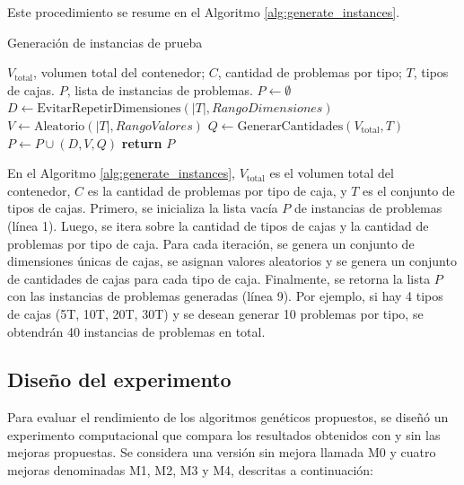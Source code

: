 \documentclass[openany]{article}
\begin{document}
Este procedimiento se resume en el Algoritmo \ref{alg:generate_instances}.

\begin{algorithm}[H]
    \caption{Generación de instancias de prueba}
    \label{alg:generate_instances}
    \begin{algorithmic}[1]
        \Require $V_{\text{total}}$, volumen total del contenedor; $C$, cantidad de problemas por tipo; $T$, tipos de cajas.
        \Ensure $P$, lista de instancias de problemas.
        \State $P \gets \emptyset$
        \State $D \gets \text{EvitarRepetirDimensiones}(|T|, RangoDimensiones)$
        \State $V \gets \text{Aleatorio}(|T|, RangoValores)$
        \State $Q \gets \text{GenerarCantidades}(V_{\text{total}}, T)$
        \State $P \gets P \cup (D, V, Q)$
        \EndFor
        \EndFor
        \State \textbf{return} $P$
    \end{algorithmic}
\end{algorithm}

En el Algoritmo \ref{alg:generate_instances}, $V_{\text{total}}$ es el volumen total del contenedor, $C$ es la cantidad de problemas por tipo de caja, y $T$ es el conjunto de tipos de cajas. Primero, se inicializa la lista vacía $P$ de instancias de problemas (línea 1). Luego, se itera sobre la cantidad de tipos de cajas y la cantidad de problemas por tipo de caja. Para cada iteración, se genera un conjunto de dimensiones únicas de cajas, se asignan valores aleatorios y se genera un conjunto de cantidades de cajas para cada tipo de caja. Finalmente, se retorna la lista $P$ con las instancias de problemas generadas (línea 9). Por ejemplo, si hay 4 tipos de cajas (5T, 10T, 20T, 30T) y se desean generar 10 problemas por tipo, se obtendrán 40 instancias de problemas en total.

\subsection{Diseño del experimento}

Para evaluar el rendimiento de los algoritmos genéticos propuestos, se diseñó un experimento computacional que compara los resultados obtenidos con y sin las mejoras propuestas. Se considera una versión sin mejora llamada M0 y cuatro mejoras denominadas M1, M2, M3 y M4, descritas a continuación:
\end{document}
